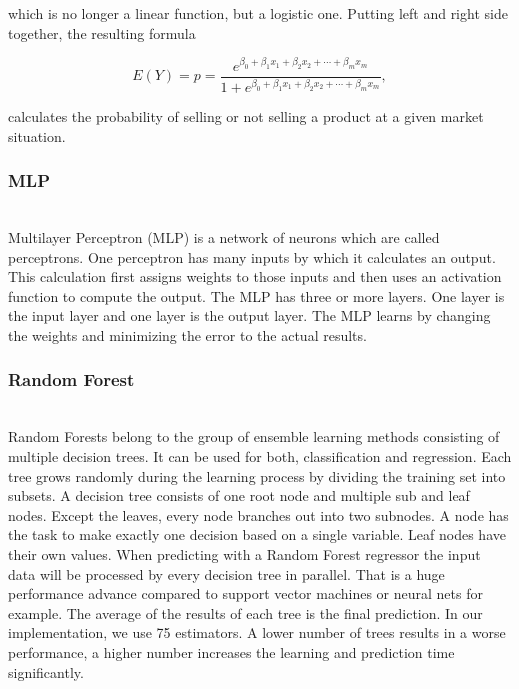     which is no longer a linear function, but a logistic one. Putting left and right side together, the resulting formula

    \begin{equation}
    \label{eq.logreg.logsolved}
    E(Y) = p = \frac{e^{\beta _{0}+\beta _{1}x_{1}+\beta _{2}x_{2}+\cdots +\beta _{m}x_{m}}}{1+e^{\beta _{0}+\beta _{1}x_{1}+\beta _{2}x_{2}+\cdots +\beta _{m}x_{m}}},
    \end{equation}

    calculates the probability of selling or not selling a product at a given market situation.
    \nocite{logreg}
\subsubsection{MLP}
    ~\\
    Multilayer Perceptron (MLP) is a network of neurons which are called perceptrons. One perceptron has many inputs by which it calculates an output. This calculation first assigns weights to those inputs and then uses an activation function to compute the output. The MLP has three or more layers. One layer is the input layer and one layer is the output layer. The MLP learns by changing the weights and minimizing the error to the actual results.
\subsubsection{Random Forest}
    ~\\
    Random Forests belong to the group of ensemble learning methods consisting of multiple decision trees. It can be used for both, classification and regression. Each tree grows randomly during the learning process by dividing the training set into subsets. A decision tree consists of one root node and multiple sub and leaf nodes. Except the leaves, every node branches out into two subnodes. A node has the task to make exactly one decision based on a single variable. Leaf nodes have their own values. When predicting with a Random Forest regressor the input data will be processed by every decision tree in parallel. That is a huge performance advance compared to support vector machines or neural nets for example. The average of the results of each tree is the final prediction.
    In our implementation, we use 75 estimators. A lower number of trees results in a worse performance, a higher number increases the learning and prediction time significantly.
    \nocite{randfor}
